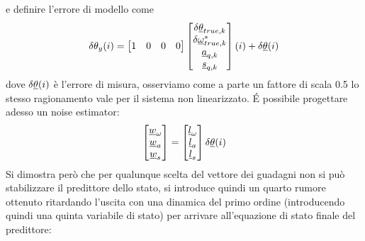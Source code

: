 e definire l'errore di modello come
\begin{equation}
	\delta \theta_y (i) = 
	\begin{bmatrix}1 & 0 & 0 & 0\end{bmatrix}
	\begin{bmatrix}
			\delta\underline{\theta}_{true,k}\\
			\delta\underline{\omega}^*_{true,k} \\
			\underline{a}_{q,k} \\
			\underline{s}_{q,k}
	\end{bmatrix}(i) + 
	\delta\underline{\theta}(i)
\end{equation}
dove $\delta\underline{\theta}(i)$ è l'errore di misura, osserviamo come a parte un
fattore di scala 0.5 lo stesso ragionamento vale per il sistema non
linearizzato.
\'{E} possibile progettare adesso un noise estimator:
\begin{equation}
	\begin{bmatrix}
		\underline{w}_\omega\\
		\underline{w}_a\\
		\underline{w}_s\\	
	\end{bmatrix}
=
	\begin{bmatrix}
		\underline{l}_\omega\\
		\underline{l}_a\\
		\underline{l}_s\\	
	\end{bmatrix}
\delta\underline{\theta}(i)
\end{equation}
Si dimostra però che per qualunque scelta del vettore dei guadagni non si può
stabilizzare il predittore dello stato, si introduce quindi un quarto rumore
ottenuto ritardando l'uscita con una dinamica del primo ordine (introducendo
quindi una quinta variabile di stato) per arrivare all'equazione di stato finale
del predittore:

